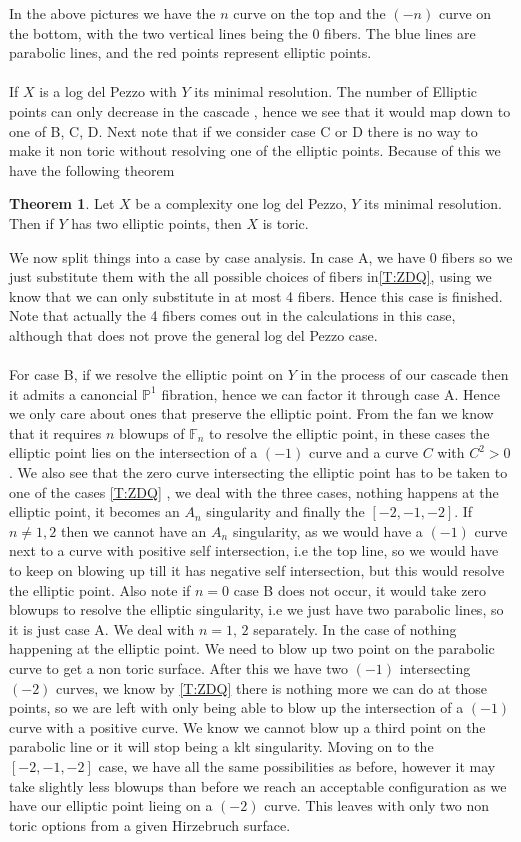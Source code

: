 \documentclass[11pt]{amsart}
\theoremstyle{definition}
\newtheorem{thm}{Theorem}[section]
\theoremstyle{definition}
\theoremstyle{definition}
\theoremstyle{definition}
\theoremstyle{definition}
\theoremstyle{definition}
\theoremstyle{definition}
\begin{document}
In the above pictures we have the $n$ curve on the top and the $(-n)$ curve on the bottom, with the two vertical lines being the 0 fibers. The blue lines are parabolic lines, and the red points represent elliptic points.
\\
\\
If $X$ is a log del Pezzo with $Y$ its minimal resolution. The number of Elliptic points can only decrease in the cascade , hence we see that it would map down to one of B, C, D. Next note that if we consider case C or D there is no way to make it non toric without resolving one of the elliptic points. Because of this we have the following theorem 
\\
\begin{thm}
Let $X$ be a complexity one log del Pezzo, $Y$ its minimal resolution. Then if $Y$ has two elliptic points, then $X$ is toric.
\end{thm}
We now split things into a case by case analysis. In case A, we have 0 fibers so we just substitute them with the all possible choices of fibers in\autoref{T:ZDQ}, using \cite{IMT} we know that we can only substitute in at most 4 fibers. Hence this case is finished. Note that actually the 4 fibers comes out in the calculations in this case, although that does not prove the general log del Pezzo case.
\\
\\
 For case B, if we resolve the elliptic point on $Y$ in the process of our cascade then it admits a canoncial $\mathbb{P}^1$ fibration, hence we can factor it through case A. Hence we only care about ones that preserve the elliptic point. From the fan we know that it requires $n$ blowups of $\mathbb{F}_n$ to resolve the elliptic point, in these cases the elliptic point lies on the intersection of a $(-1)$ curve and a curve $C$ with $C^2 > 0$. We also see that the zero curve intersecting the elliptic point has to be taken to one of the cases \autoref{T:ZDQ} , we deal with the three cases, nothing happens at the elliptic point, it becomes an $A_n$ singularity and finally the $[ -2, -1, -2]$. If $n \neq 1,2$ then we cannot have an $A_n$ singularity, as we would have a $(-1)$ curve next to a curve with positive self intersection, i.e  the top line, so we would have to keep on blowing up till it has negative self intersection, but this would resolve the elliptic point. Also note if $n=0$ case B does not occur, it would take zero blowups to resolve the elliptic singularity, i.e we just have two parabolic lines, so it is just case A. We deal with $n=1, \, 2$ separately. In the case of nothing happening at the elliptic point. We need to blow up two point on the parabolic curve to get a non toric surface. After this we have two $(-1)$ intersecting $(-2)$ curves, we know by \autoref{T:ZDQ} there is nothing more we can do at those points, so we are left with only being able to blow up the intersection of a $(-1)$ curve with a positive curve. We know we cannot blow up a third point on the parabolic line or it will stop being a klt singularity.  Moving on to the $[-2, -1, -2]$ case, we have all the same possibilities as before, however it may take slightly less blowups than before we reach an acceptable configuration as we have our elliptic point lieing on a $(-2)$ curve. This leaves with only two non toric options from a given Hirzebruch surface.
\end{document}
